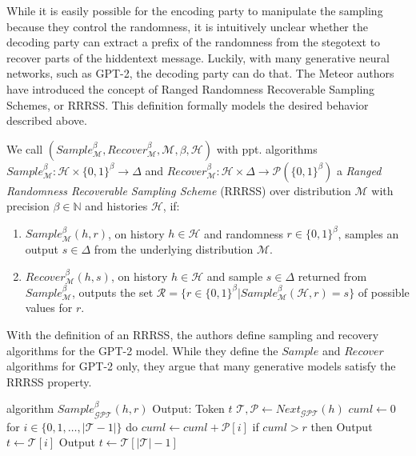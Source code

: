 While it is easily possible for the encoding party to manipulate the sampling because they control the randomness, it is intuitively unclear whether the decoding party can extract a prefix of the randomness from the stegotext to recover parts of the hiddentext message.
Luckily, with many generative neural networks, such as GPT-2, the decoding party can do that.
The Meteor authors have introduced the concept of Ranged Randomness Recoverable Sampling Schemes, or RRRSS.
This definition formally models the desired behavior described above.
\begin{definition}
  \label{def:rrrss}
  We call 
  $(Sample_{\mathcal{M}}^\beta, Recover_{\mathcal{M}}^\beta, \mathcal{M}, \beta, \mathcal{H})$ 
  with ppt. algorithms
  $Sample_{\mathcal{M}}^\beta \colon \mathcal{H} \times \{0,1\}^\beta \rightarrow \Delta$ 
  and 
  $Recover_{\mathcal{M}}^\beta \colon \mathcal{H} \times \Delta \rightarrow \mathcal{P}(\{0,1\}^\beta)$ 
  a \emph{Ranged Randomness Recoverable Sampling Scheme} (RRRSS) over distribution $\mathcal{M}$ with precision $\beta \in \mathbb{N}$ and histories $\mathcal{H}$, if:
  
  \begin{enumerate}
    \item $Sample_{\mathcal{M}}^\beta(h, r)$, on history $h \in \mathcal{H}$ and randomness $r \in \{0,1\}^\beta$, samples an output $s \in \Delta$ from the underlying distribution $\mathcal{M}$.
    \item $Recover_{\mathcal{M}}^\beta(h, s)$, on history $h \in \mathcal{H}$ and sample $s \in \Delta$ returned from $Sample_{\mathcal{M}}^\beta$, outputs the set $\mathcal{R} = \{ r \in \{0,1\}^\beta | Sample_{\mathcal{M}}^\beta(\mathcal{H}, r) = s \}$ of possible values for $r$.
  \end{enumerate}
\end{definition}
With the definition of an RRRSS, the authors define sampling and recovery algorithms for the GPT-2 model.
While they define the $Sample$ and $Recover$ algorithms for GPT-2 only, they argue that many generative models satisfy the RRRSS property.

\begin{Pseudocode}[caption={
RRRSS $Sample$ algorithm for GPT-2 \cite{Meteor2021}.
$Sample$ produces, given a history $h$ and a value $r$, the next token sampled according to $r$ from the distribution for the next token generated by $Next_{\mathcal{GPT}}(h)$.
}]
algorithm $Sample_{\mathcal{GPT}}^\beta(  h, r)$
  Output: Token $t$
  $\mathcal{T}, \mathcal{P} \leftarrow Next_{\mathcal{GPT}}(h)$
  $cuml \leftarrow 0$
  for $i \in \{ 0, 1, \dots, | \mathcal{T} - 1 | \}$ do
    $cuml \leftarrow cuml + \mathcal{P}[i]$
    if $cuml > r$ then
      Output $t \leftarrow \mathcal{T}[i]$
  Output $t \leftarrow \mathcal{T}[|\mathcal{T}|-1]$
\end{Pseudocode}

